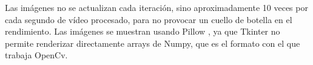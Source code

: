 Las imágenes no se actualizan cada iteración, sino aproximadamente 10 veces por cada segundo de vídeo procesado, para no provocar un cuello de botella en el rendimiento. Las imágenes se muestran usando Pillow \cite{pillow2023}, ya que Tkinter no permite renderizar directamente arrays de Numpy, que es el formato con el que trabaja OpenCv.
